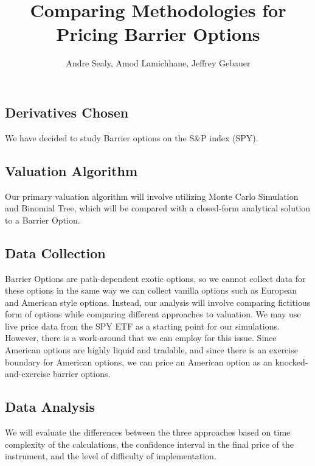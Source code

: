 \documentclass[16pt]{article}
\title{Comparing Methodologies for Pricing Barrier Options}
\author{Andre Sealy, Amod Lamichhane, Jeffrey Gebauer}
\begin{document}
\onehalfspacing 
\maketitle
\subsection*{Derivatives Chosen}

We have decided to study Barrier options on the S\&P index (SPY).

\subsection*{Valuation Algorithm}

Our primary valuation algorithm will involve utilizing Monte Carlo Simulation and Binomial Tree, which will be compared with a closed-form analytical solution to a Barrier Option.

\subsection*{Data Collection}

Barrier Options are path-dependent exotic options, so we cannot collect data for these options in the same way we can collect vanilla options such as European and American style options. Instead, our analysis will involve comparing fictitious form of options while comparing different approaches to valuation. We may use live price data from the SPY ETF as a starting point for our simulations. 
\newline
\newline
However, there is a work-around that we can employ for this issue. Since American options are highly liquid and tradable, and since there is an exercise boundary for American options, we can price an American option as an knocked-and-exercise barrier options.
\subsection*{Data Analysis}
We will evaluate the differences between the three approaches based on time complexity of the calculations, the confidence interval in the final price of the instrument, and the level of difficulty of implementation.
\end{document}
